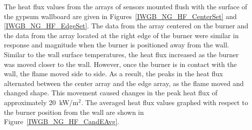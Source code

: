 \documentclass[twoside]{uocthesis}
\begin{document}
{\clearpage

The heat flux values from the arrays of sensors mounted flush with the surface of the gypsum wallboard are given in Figures~\ref{IWGB_NG_HF_CenterSet} and \ref{IWGB_NG_HF_EdgeSet}.  The data from the array centered on the burner and the data from the array located at the right edge of the burner were similar in response and magnitude when the burner is positioned away from the wall.  Similar to the wall surface temperatures, the heat flux increased as the burner was moved closer to the wall.  However, once the burner is in contact with the wall, the flame moved side to side.  As a result, the peaks in the heat flux alternated between the center array and the edge array, as the flame moved and changed shape.  This movement caused changes in the peak heat flux of approximately 20~kW/m$^2$.  The averaged heat flux values graphed with respect to the burner position from the wall are shown in Figure~\ref{IWGB_NG_HF_CandEAvg}.     

}
\end{document}
